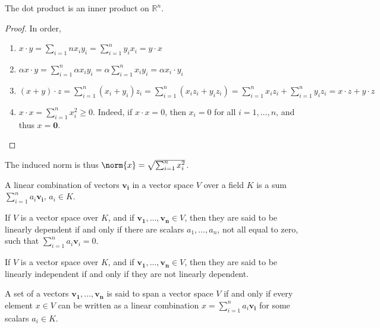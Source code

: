 \documentclass[crop=false,class=article,oneside]{standalone}
\begin{document}
        \begin{theorem}
        The dot product is an inner product on $\mathbb{R}^n$.
        \end{theorem}
        \begin{proof}
        In order,
        \begin{enumerate}
        \item $x\cdot y = \sum_{i=1}{n} x_i y_i = \sum_{i=1}^{n} y_i x_i = y\cdot x$
        \item $\alpha x\cdot y = \sum_{i=1}^{n} \alpha x_i y_i = \alpha \sum_{i=1}^{n} x_i y_i = \alpha x_i \cdot y_i$
        \item $(x+y)\cdot z = \sum_{i=1}^{n} (x_i+y_i)z_i = \sum_{i=1}^{n} (x_iz_i +y_i z_i)=\sum_{i=1}^{n}x_i z_i+\sum_{i=1}^{n} y_i z_i = x\cdot z + y\cdot z$
        \item $x\cdot x = \sum_{i=1}^{n} x_i^2 \geq 0$. Indeed, if $x\cdot x = 0$, then $x_i = 0$ for all $i=1,\hdots, n$, and thus $x=\mathbf{0}$.
        \end{enumerate}
        \end{proof}
        \begin{remark}
        The induced norm is thus $\norm{x} = \sqrt{\sum_{i=1}^{n} x_i^2}$.
        \end{remark}
        \begin{definition}
        A linear combination of vectors $\mathbf{v_i}$ in a vector space $V$ over a field $K$ is a sum $\sum_{i=1}^{n} a_i \mathbf{v_i}$, $a_i \in K$.
        \end{definition}
        \begin{definition}
        If $V$ is a vector space over $K$, and if $\mathbf{v_1},\hdots, \mathbf{v_n}\in V$, then they are said to be linearly dependent if and only if there are scalars $a_1,\hdots, a_n$, not all equal to zero, such that $\sum_{i=1}^{n} a_i \mathbf{v}_i = 0$.
        \end{definition}
        \begin{definition}
        If $V$ is a vector space over $K$, and if $\mathbf{v_1},\hdots, \mathbf{v_n}\in V$, then they are said to be linearly independent if and only if they are not linearly dependent.
        \end{definition}
        \begin{definition}
        A set of a vectors $\mathbf{v_1},\hdots, \mathbf{v_n}$ is said to span a vector space $V$ if and only if every element $x\in V$ can be written as a linear combination $x=\sum_{i=1}^{n} a_i \mathbf{v_i}$ for some scalars $a_i \in K$.
        \end{definition}
\end{document}
